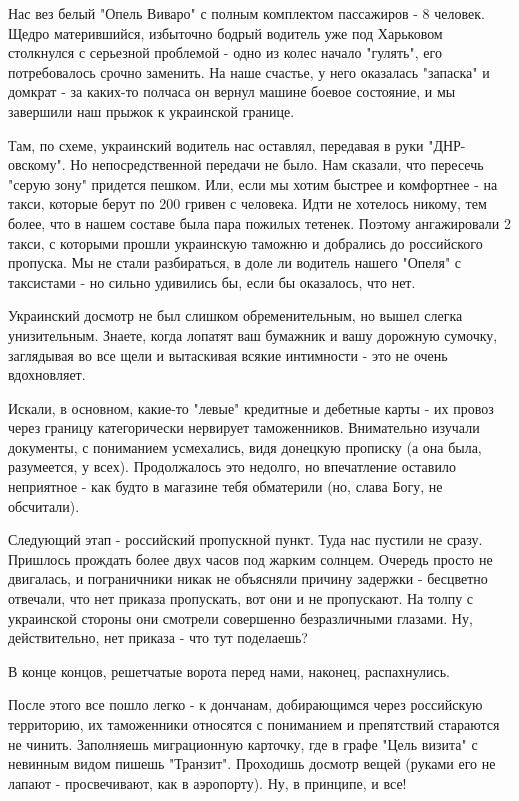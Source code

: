 Нас вез белый "Опель Виваро" с полным комплектом пассажиров - 8 человек. Щедро
матерившийся, избыточно бодрый водитель уже под Харьковом столкнулся с
серьезной проблемой - одно из колес начало "гулять", его потребовалось срочно
заменить. На наше счастье, у него оказалась "запаска" и домкрат - за каких-то
полчаса он вернул машине боевое состояние, и мы завершили наш прыжок к
украинской границе.

Там, по схеме, украинский водитель нас оставлял, передавая в руки
"ДНР-овскому". Но непосредственной передачи не было. Нам сказали, что пересечь
"серую зону" придется пешком. Или, если мы хотим быстрее и комфортнее - на
такси, которые берут по 200 гривен с человека. Идти не хотелось никому, тем
более, что в нашем составе была пара пожилых тетенек. Поэтому ангажировали 2
такси, с которыми прошли украинскую таможню и добрались до российского
пропуска. Мы не стали разбираться, в доле ли водитель нашего "Опеля" с
таксистами - но сильно удивились бы, если бы оказалось, что нет. 

Украинский досмотр не был слишком обременительным, но вышел слегка
унизительным. Знаете, когда лопатят ваш бумажник и вашу дорожную сумочку,
заглядывая во все щели и вытаскивая всякие интимности - это не очень
вдохновляет.

Искали, в основном, какие-то "левые" кредитные и дебетные карты - их провоз
через границу категорически нервирует таможенников. Внимательно изучали
документы, с пониманием усмехались, видя донецкую прописку (а она была,
разумеется, у всех). Продолжалось это недолго, но впечатление оставило
неприятное - как будто в магазине тебя обматерили (но, слава Богу, не
обсчитали).

Следующий этап - российский пропускной пункт. Туда нас пустили не сразу.
Пришлось прождать более двух часов под жарким солнцем. Очередь просто не
двигалась, и пограничники никак не объясняли причину задержки - бесцветно
отвечали, что нет приказа пропускать, вот они и не пропускают. На толпу с
украинской стороны они смотрели совершенно безразличными глазами. Ну,
действительно, нет приказа - что тут поделаешь?

В конце концов, решетчатые ворота перед нами, наконец, распахнулись.

После этого все пошло легко - к дончанам, добирающимся через российскую
территорию, их таможенники относятся с пониманием и препятствий стараются не
чинить. Заполняешь миграционную карточку, где в графе "Цель визита" с невинным
видом пишешь "Транзит". Проходишь досмотр вещей (руками его не лапают -
просвечивают, как в аэропорту). Ну, в принципе, и все!

